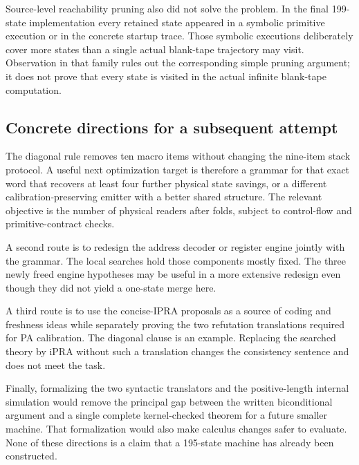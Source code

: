 Source-level reachability pruning also did not solve the problem. In the final 199-state implementation every retained state appeared in a symbolic primitive execution or in the concrete startup trace. Those symbolic executions deliberately cover more states than a single actual blank-tape trajectory may visit. Observation in that family rules out the corresponding simple pruning argument; it does not prove that every state is visited in the actual infinite blank-tape computation.

\subsection{Concrete directions for a subsequent attempt}
The diagonal rule removes ten macro items without changing the nine-item stack protocol. A useful next optimization target is therefore a grammar for that exact word that recovers at least four further physical state savings, or a different calibration-preserving emitter with a better shared structure. The relevant objective is the number of physical readers after folds, subject to control-flow and primitive-contract checks.

A second route is to redesign the address decoder or register engine jointly with the grammar. The local searches hold those components mostly fixed. The three newly freed engine hypotheses may be useful in a more extensive redesign even though they did not yield a one-state merge here.

A third route is to use the concise-IPRA proposals as a source of coding and freshness ideas while separately proving the two refutation translations required for PA calibration. The diagonal clause is an example. Replacing the searched theory by iPRA without such a translation changes the consistency sentence and does not meet the task.

Finally, formalizing the two syntactic translators and the positive-length internal simulation would remove the principal gap between the written biconditional argument and a single complete kernel-checked theorem for a future smaller machine. That formalization would also make calculus changes safer to evaluate. None of these directions is a claim that a 195-state machine has already been constructed.
